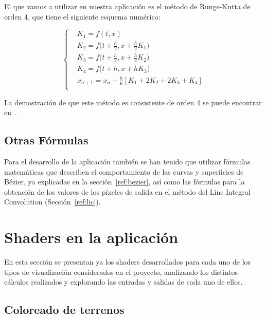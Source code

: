 El que vamos a utilizar en nuestra aplicación es el método de Runge-Kutta de
orden 4, que tiene el siguiente esquema numérico:

\begin{equation}
	\left\{	
		\begin{aligned}
			& K_1 = f(t,x) \\
			& K_2 = f\bigg(t+\frac{h}{2},x+\frac{h}{2}K_1\bigg) \\
			& K_3 = f\bigg(t+\frac{h}{2},x+\frac{h}{2}K_2\bigg) \\
			& K_4 = f\Big(t+h,x+hK_3\Big) \\
			& x_{n+1} = x_n + \frac{h}{6}[K_1 + 2K_2 + 2K_3 + K_4] \\
		\end{aligned}
	\right.
\end{equation}

La demostración de que este método es consistente de orden 4 se puede encontrar
en~\citet{ANNU}.

\subsection{Otras Fórmulas}
\label{makereference5.4.4}

Para el desarrollo de la aplicación también se han tenido que utilizar fórmulas
matemáticas que describen el comportamiento de las curvas y superficies de
Bézier, ya explicadas en la sección~\ref{ref:bezier}, así como las
fórmulas para la obtención de los valores de los píxeles de salida en el método
del Line Integral Convolution (Sección~\ref{ref:lic}).

\section{Shaders en la aplicación}
\label{makereference5.5}

En esta sección se presentan ya los shaders desarrollados para cada uno de los
tipos de visualización considerados en el proyecto, analizando los distintos
cálculos realizados y explorando las entradas y salidas de cada uno de ellos.

\subsection{Coloreado de terrenos}
\label{makereference5.5.1}

